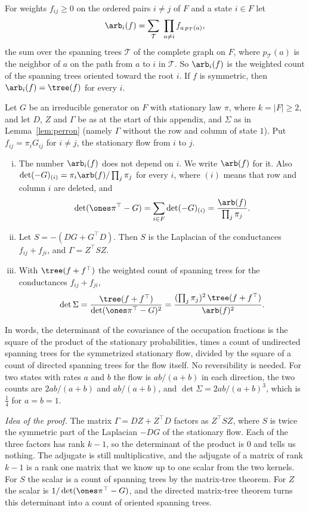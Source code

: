 For weights $f_{ij}\ge0$ on the ordered pairs $i\ne j$ of $F$ and a state $i\in F$ let
\[
\arb_i(f)=\sum_{\mathcal T}\ \prod_{a\ne i}f_{a\,p_{\mathcal T}(a)},
\]
the sum over the spanning trees $\mathcal T$ of the complete graph on $F$, where
$p_{\mathcal T}(a)$ is the neighbor of $a$ on the path from $a$ to $i$ in $\mathcal T$. So
$\arb_i(f)$ is the weighted count of the spanning trees oriented toward the root $i$. If $f$ is
symmetric, then $\arb_i(f)=\tree(f)$ for every $i$.

\begin{lemma}\label{lem:forest}
Let $G$ be an irreducible generator on $F$ with stationary law $\pi$, where $k=|F|\ge2$, and let
$D$, $Z$ and $\Gamma$ be as at the start of this appendix, and $\Sigma$ as in
Lemma~\ref{lem:perron} (namely $\Gamma$ without the row and column of state $1$). Put $f_{ij}=\pi_iG_{ij}$ for
$i\ne j$, the stationary flow from $i$ to $j$.
\begin{enumerate}[(i)]
\item The number $\arb_i(f)$ does not depend on $i$. We write $\arb(f)$ for it. Also
$\det(-G)_{(i)}=\pi_i\arb(f)/\prod_j\pi_j$ for every $i$, where $(i)$ means that row and column
$i$ are deleted, and
\[
\det(\ones\pi^\top-G)=\sum_{i\in F}\det(-G)_{(i)}=\frac{\arb(f)}{\prod_j\pi_j}.
\]
\item Let $S=-(DG+G^\top D)$. Then $S$ is the Laplacian of the conductances
$f_{ij}+f_{ji}$, and $\Gamma=Z^\top SZ$.
\item With $\tree(f+f^\top)$ the weighted count of spanning trees for the conductances
$f_{ij}+f_{ji}$,
\[
\det\Sigma=\frac{\tree(f+f^\top)}{\det(\ones\pi^\top-G)^2}
=\frac{(\prod_j\pi_j)^2\,\tree(f+f^\top)}{\arb(f)^2}.
\]
\end{enumerate}
\end{lemma}

In words, the determinant of the covariance of the occupation fractions is the square of the
product of the stationary probabilities, times a count of undirected spanning trees for the
symmetrized stationary flow, divided by the square of a count of directed spanning trees for the
flow itself. No reversibility is needed. For two states with rates $a$ and $b$ the flow is
$ab/(a+b)$ in each direction, the two counts are $2ab/(a+b)$ and $ab/(a+b)$, and
$\det\Sigma=2ab/(a+b)^3$, which is $\frac14$ for $a=b=1$.

\emph{Idea of the proof.} The matrix $\Gamma=DZ+Z^\top D$ factors as $Z^\top SZ$, where $S$ is
twice the symmetric part of the Laplacian $-DG$ of the stationary flow. Each of the three
factors has rank $k-1$, so the determinant of the product is $0$ and tells us nothing. The
adjugate is still multiplicative, and the adjugate of a matrix of rank $k-1$ is a rank one
matrix that we know up to one scalar from the two kernels. For $S$ the scalar is a count of
spanning trees by the matrix-tree theorem. For $Z$ the scalar is $1/\det(\ones\pi^\top-G)$, and
the directed matrix-tree theorem turns this determinant into a count of oriented spanning trees.

